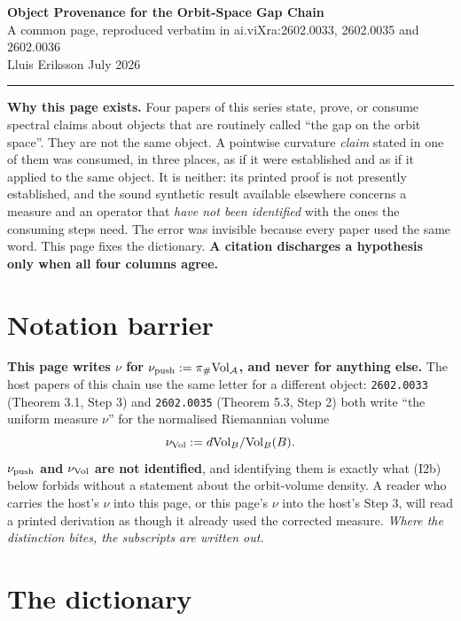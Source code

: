 \documentclass[11pt]{article}
\newcommand{\A}{\mathcal A}
\begin{document}
\begin{center}
{\Large\bfseries Object Provenance for the Orbit-Space Gap Chain}\\[4pt]
{\normalsize A common page, reproduced verbatim in
ai.viXra:2602.0033, 2602.0035 and 2602.0036}\\[4pt]
Lluis Eriksson \quad\textbullet\quad July 2026
\end{center}

\noindent\rule{\textwidth}{0.8pt}

\vspace{2pt}
\noindent
\textbf{Why this page exists.} Four papers of this series state, prove, or consume
spectral claims about objects that are routinely called ``the gap on the orbit
space''. They are not the same object. A pointwise curvature \emph{claim} stated in
one of them was consumed, in three places, as if it were established and as if it
applied to the same object. It is neither: its printed proof is not presently
established, and the sound synthetic result available elsewhere concerns a measure and
an operator that \emph{have not been identified} with the ones the consuming steps
need. The error was invisible because every paper used
the same word. This page fixes the dictionary. \textbf{A citation discharges a
hypothesis only when all four columns agree.}

\section*{Notation barrier}

\textbf{This page writes $\nu$ for $\nu_{\rm push}:=\pi_\#\mathrm{Vol}_{\A}$, and never
for anything else.} The host papers of this chain use the same letter for a different
object: \texttt{2602.0033} (Theorem 3.1, Step 3) and \texttt{2602.0035} (Theorem 5.3,
Step 2) both write ``the uniform measure $\nu$'' for the normalised Riemannian volume
\[
\nu_{\rm Vol}:=d\mathrm{Vol}_B/\mathrm{Vol}_B(B).
\]
\textbf{$\nu_{\rm push}$ and $\nu_{\rm Vol}$ are not identified}, and identifying them
is exactly what (I2b) below forbids without a statement about the orbit-volume density.
A reader who carries the host's $\nu$ into this page, or this page's $\nu$ into the
host's Step 3, will read a printed derivation as though it already used the corrected
measure. \emph{Where the distinction bites, the subscripts are written out.}

\section*{The dictionary}
\end{document}
